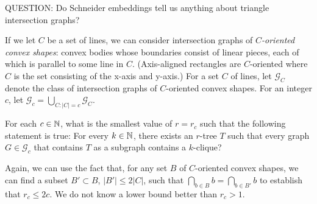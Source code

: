 \documentclass[lotsofwhite]{patmorin}
\begin{document}
QUESTION: Do Schneider embeddings tell us anything about triangle
intersection graphs?

If we let $C$ be a set of lines, we can consider intersection graphs
of \emph{$C$-oriented convex shapes}: convex bodies whose boundaries
consist of linear pieces, each of which is parallel to some line in $C$.
(Axis-aligned rectangles are $C$-oriented where $C$ is the set consisting
of the x-axis and y-axis.)  For a set $C$ of lines, let $\mathcal{G}_C$
denote the class of intersection graphs of $C$-oriented convex shapes.
For an integer $c$, let $\mathcal{G}_c=\bigcup_{C:|C|=c}\mathcal{G}_C$.

\begin{op}
   For each $c\in\mathbb{N}$, what is the smallest value of $r=r_c$ such that the
   following statement is true: For every $k\in\mathbb{N}$, there exists an
   $r$-tree $T$ such that every graph $G\in\mathcal{G}_c$ that contains
   $T$ as a subgraph contains a $k$-clique?
\end{op}

Again, we can use the fact that, for any set $B$ of $C$-oriented convex
shapes, we can find a subset $B'\subset B$, $|B'|\le 2|C|$, such that
$\bigcap_{b\in B}b=\bigcap_{b\in B'} b$ to establish that $r_c \le 2c$.
We do not know a lower bound better than $r_c > 1$.



\end{document}
